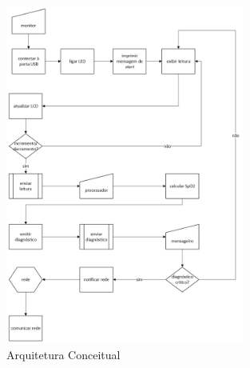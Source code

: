 \begin{figure}[H]
  \centering
  \includegraphics[width=0.7\textwidth]{assets/img/diagrama.png}
  \caption{Arquitetura Conceitual}
  \label{fig:fig4}
\end{figure}